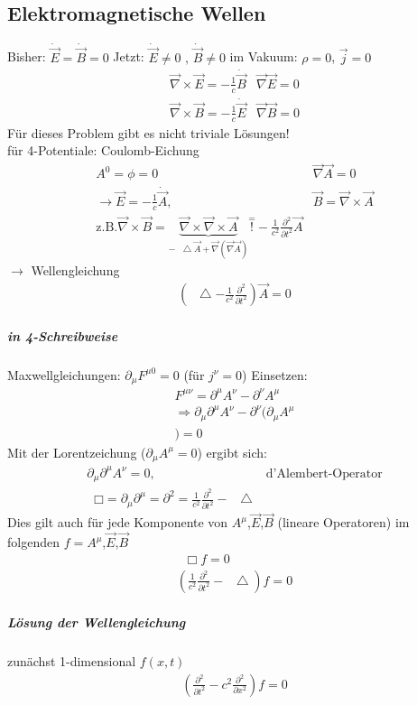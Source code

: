 \documentclass[a4paper]{article}
\newcommand*\laplace{\mathop{}\!\mathbin\bigtriangleup}
\newcommand*\dalembert{\mathop{}\!\mathbin\Box}
\begin{document}
\subsection{Elektromagnetische Wellen}
Bisher: $\dot{\vec{E}}=\dot{\vec{B}}=0$
Jetzt: $\dot{\vec{E}}\neq0\text{ , } \dot{\vec{B}}\neq0$ im Vakuum: $\rho=0$, $\vec{j}=0$
\begin{align}
\vec{\nabla}\times\vec{E}=-\frac{1}{c}\dot{\vec{B}} & \vec{\nabla}\vec{E}=0\\
\vec{\nabla}\times\vec{B}=-\frac{1}{c}\dot{\vec{E}} & \vec{\nabla}\vec{B}=0
\end{align}
Für dieses Problem gibt es nicht triviale Lösungen!\\
für 4-Potentiale: Coulomb-Eichung
\begin{align}
A^0=\phi=0 & \vec{\nabla}\vec{A}=0\\
\rightarrow \vec{E}=-\frac{1}{c}\dot{\vec{A}} \text{,} & \vec{B}=\vec{\nabla}\times\vec{A}\\
\text{z.B.} \vec{\nabla}\times\vec{B}=\underbrace{\vec{\nabla}\times\vec{\nabla}\times\vec{A}}_{-\laplace \vec{A}+\vec{\nabla}(\vec{\nabla}\vec{A})}
\overset{=}{!}-\frac{1}{c^2}\frac{\partial^2}{\partial t^2}\vec{A}
\end{align}
$\rightarrow$ Wellengleichung
\begin{align}
\left(\laplace-\frac{1}{c^2}\frac{\partial^2}{\partial t^2}\right)\vec{A}=0
\end{align}
\subparagraph{in 4-Schreibweise}
Maxwellgleichungen: $\partial_\mu F^{\mu0}=0$ (für $j^\nu=0$)
Einsetzen:
\begin{align}
F^{\mu\nu}=\partial^\mu A^\nu -\partial^\nu A^\mu\\
\Rightarrow \partial_\mu\partial^\mu A^\nu -\partial^\nu (\partial_\mu A^\mu\\)=0
\end{align}
Mit der Lorentzeichung ($\partial_\mu A^\mu=0$) ergibt sich:
\begin{align}
\partial_\mu\partial^\mu A^\nu=0, & \text{d'Alembert-Operator}\\
\dalembert=\partial_\mu\partial^\mu=\partial^2=\frac{1}{c^2}\frac{\partial^2}{\partial t^2}-\laplace
\end{align}
Dies gilt auch für jede Komponente von $A^\mu$,$\vec{E}$,$\vec{B}$ (lineare Operatoren) im folgenden $f=A^\mu$,$\vec{E}$,$\vec{B}$
\begin{align}
\dalembert f=0\\
\left(\frac{1}{c^2}\frac{\partial^2}{\partial t^2}-\laplace\right) f=0
\end{align}
\subparagraph{Lösung der Wellengleichung}
zunächst 1-dimensional $f(x,t)$
\begin{align}
\left(\frac{\partial^2}{\partial t^2}-c^2\frac{\partial^2}{\partial x^2}\right) f=0
\end{align}
\end{document}
